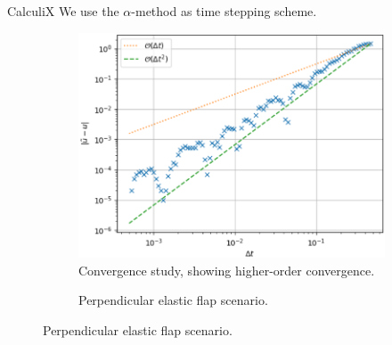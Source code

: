 \documentclass[
  english,            %
  aspectratio=43,    %
]{tumbeamer}
\begin{document}
\begin{frame}{CalculiX}
We use the $\alpha$-method as time stepping scheme.

\begin{figure}[!ht]
    \centering
    \begin{subfigure}[b]{0.5\textwidth}
        \includegraphics[width=\textwidth]{resources/calculix_convergence_study.png}
        \caption{Convergence study, showing higher-order convergence.}
    \end{subfigure}
    \hspace{0.8cm}
    \begin{subfigure}[b]{0.35\textwidth}
        \caption{Perpendicular elastic flap scenario.}
    \end{subfigure}
    \label{fig:calculix_convergence}
\end{figure}
\end{frame}
\end{document}
